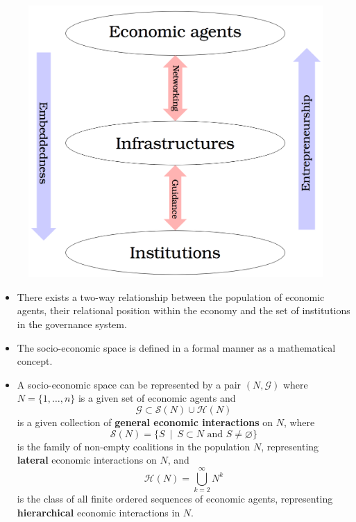 \documentclass[10pt]{beamer}
\begin{document}
\begin{frame}
\begin{figure}[h]
\centering
\includegraphics[scale=0.135]{../Images/structure-space.png}
\end{figure}
\begin{itemize}
\item There exists a two-way relationship between the population of economic agents, their relational position within the economy and the set of institutions in the governance system.
\end{itemize}
\end{frame}


\begin{frame}
\begin{itemize}
\item The socio-economic space is defined in a formal manner as a mathematical concept.
\medskip
\item A socio-economic space can be represented by a pair $(N, \mathcal{G})$ where $N = \{1, \ldots, n\}$ is a given set of economic agents and
\begin{equation*}
\mathcal{G} \subset \mathcal{S}(N) \cup \mathcal{H}(N)
\end{equation*}
is a given collection of \textbf{general economic interactions} on $N$, where
\begin{equation*}
\mathcal{S}(N) = \{ S ~ \mid ~ S \subset N \mbox{ and } S \neq \varnothing \}
\end{equation*}
is the family of non-empty coalitions in the population $N$, representing \textbf{lateral} economic interactions on $N$, and
\begin{equation*}
\mathcal{H}(N) = \bigcup_{k = 2}^{\infty} N^{k}
\end{equation*}
is the class of all finite ordered sequences of economic agents, representing \textbf{hierarchical} economic interactions in $N$.
\end{itemize}
\end{frame}
\end{document}
